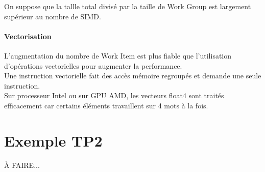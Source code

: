 \documentclass[oneside]{book}
\begin{document}
On suppose que la tallle total divisé par la taille de Work Group est largement supérieur au nombre de SIMD.

\paragraph{Vectorisation}

L'augmentation du nombre de Work Item est plus fiable
que l'utilisation d'opérations vectorielles pour augmenter la
performance.\\

Une instruction vectorielle fait des accès mémoire
regroupés et demande une seule instruction.\\

Sur processeur Intel ou sur GPU AMD, les vecteurs float4
sont traités efficacement car certains éléments travaillent
sur 4 mots à la fois.\\

\section{Exemple TP2}
À FAIRE...
\end{document}
